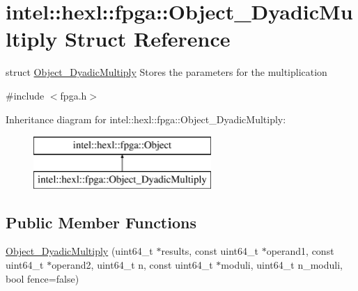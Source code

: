 \hypertarget{structintel_1_1hexl_1_1fpga_1_1Object__DyadicMultiply}{\section{intel\-:\-:hexl\-:\-:fpga\-:\-:Object\-\_\-\-Dyadic\-Multiply Struct Reference}
\label{structintel_1_1hexl_1_1fpga_1_1Object__DyadicMultiply}
}


struct \hyperlink{structintel_1_1hexl_1_1fpga_1_1Object__DyadicMultiply}{Object\-\_\-\-Dyadic\-Multiply} Stores the parameters for the multiplication  




{\ttfamily \#include $<$fpga.\-h$>$}

Inheritance diagram for intel\-:\-:hexl\-:\-:fpga\-:\-:Object\-\_\-\-Dyadic\-Multiply\-:\begin{figure}[H]
\begin{center}
\leavevmode
\includegraphics[height=2.000000cm]{structintel_1_1hexl_1_1fpga_1_1Object__DyadicMultiply}
\end{center}
\end{figure}
\subsection*{Public Member Functions}
\begin{DoxyCompactItemize}
\item 
\hyperlink{structintel_1_1hexl_1_1fpga_1_1Object__DyadicMultiply_a168d5a114faaab094ef85324293ea86e}{Object\-\_\-\-Dyadic\-Multiply} (uint64\-\_\-t $\ast$results, const uint64\-\_\-t $\ast$operand1, const uint64\-\_\-t $\ast$operand2, uint64\-\_\-t n, const uint64\-\_\-t $\ast$moduli, uint64\-\_\-t n\-\_\-moduli, bool fence=false)
\end{DoxyCompactItemize}
